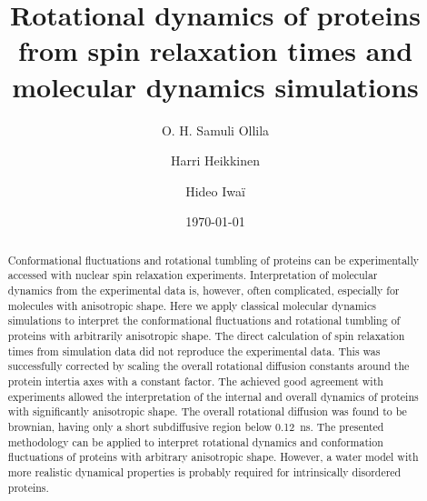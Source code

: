 \documentclass[pre,aps,floatfix,authordate1-4,twocolumn]{revtex4-1}
\begin{document}

\title{Rotational dynamics of proteins from spin relaxation times and molecular dynamics simulations} %



\author{O. H. Samuli Ollila}

\author{Harri Heikkinen}

\author{Hideo Iwa\"i}


\date{\today}

\begin{abstract}
  Conformational fluctuations and rotational tumbling of proteins can be experimentally accessed
  with nuclear spin relaxation experiments. Interpretation of molecular dynamics from the
  experimental data is, however, often complicated, especially for molecules with anisotropic
  shape. Here we apply classical molecular dynamics simulations to interpret the conformational fluctuations
  and rotational tumbling of proteins with arbitrarily anisotropic shape. The direct calculation
  of spin relaxation times from simulation data did not reproduce the experimental data.
  This was successfully corrected by scaling the overall rotational diffusion constants around the
  protein intertia axes with a constant factor. The achieved good agreement with experiments
  allowed the interpretation of the internal and overall dynamics of proteins with significantly
  anisotropic shape. The overall rotational diffusion was found to be brownian, having only a
  short subdiffusive region below 0.12~ns. The presented methodology can be applied to
  interpret rotational dynamics and conformation fluctuations of proteins with arbitrary anisotropic
  shape. However, a water model with more realistic dynamical properties is probably required
  for intrinsically disordered proteins.
\end{abstract}
\end{document}
